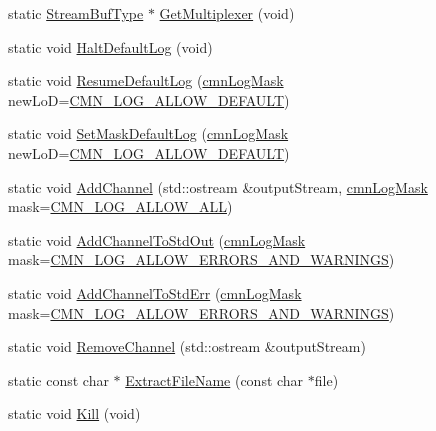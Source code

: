 \begin{DoxyCompactItemize}
\item 
static \hyperlink{classcmn_logger_a7d192777882d1dc6bb48ceac0b4e65bb}{Stream\+Buf\+Type} $\ast$ \hyperlink{classcmn_logger_aa9a44af4d1640661d784d1da92c9d394}{Get\+Multiplexer} (void)
\item 
static void \hyperlink{classcmn_logger_ac776c83953b0b6fc8797928dbdd88692}{Halt\+Default\+Log} (void)
\item 
static void \hyperlink{classcmn_logger_adbfa3e3002c704d689674f77c9deb525}{Resume\+Default\+Log} (\hyperlink{cmn_log_lo_d_8h_a44b6ef7560b0d204460b0a54f1a5d702}{cmn\+Log\+Mask} new\+Lo\+D=\hyperlink{cmn_log_lo_d_8h_a941e5ff3075571f0ad1e53e1204bd856}{C\+M\+N\+\_\+\+L\+O\+G\+\_\+\+A\+L\+L\+O\+W\+\_\+\+D\+E\+F\+A\+U\+L\+T})
\item 
static void \hyperlink{classcmn_logger_a1382ea96a6eb493c5aff86256b1f5fc7}{Set\+Mask\+Default\+Log} (\hyperlink{cmn_log_lo_d_8h_a44b6ef7560b0d204460b0a54f1a5d702}{cmn\+Log\+Mask} new\+Lo\+D=\hyperlink{cmn_log_lo_d_8h_a941e5ff3075571f0ad1e53e1204bd856}{C\+M\+N\+\_\+\+L\+O\+G\+\_\+\+A\+L\+L\+O\+W\+\_\+\+D\+E\+F\+A\+U\+L\+T})
\item 
static void \hyperlink{classcmn_logger_aa051a07e639b507c0db05af0aafd266e}{Add\+Channel} (std\+::ostream \&output\+Stream, \hyperlink{cmn_log_lo_d_8h_a44b6ef7560b0d204460b0a54f1a5d702}{cmn\+Log\+Mask} mask=\hyperlink{cmn_log_lo_d_8h_acf03c43c8a0fbe1c13b2aa4ac3b0a856}{C\+M\+N\+\_\+\+L\+O\+G\+\_\+\+A\+L\+L\+O\+W\+\_\+\+A\+L\+L})
\item 
static void \hyperlink{classcmn_logger_a3dc3179f73e32ba953e6c54f04e7e2a8}{Add\+Channel\+To\+Std\+Out} (\hyperlink{cmn_log_lo_d_8h_a44b6ef7560b0d204460b0a54f1a5d702}{cmn\+Log\+Mask} mask=\hyperlink{cmn_log_lo_d_8h_a4414b84b0d7c28e5df5728224b987125}{C\+M\+N\+\_\+\+L\+O\+G\+\_\+\+A\+L\+L\+O\+W\+\_\+\+E\+R\+R\+O\+R\+S\+\_\+\+A\+N\+D\+\_\+\+W\+A\+R\+N\+I\+N\+G\+S})
\item 
static void \hyperlink{classcmn_logger_a987bfb4a959245edb504f34392f16904}{Add\+Channel\+To\+Std\+Err} (\hyperlink{cmn_log_lo_d_8h_a44b6ef7560b0d204460b0a54f1a5d702}{cmn\+Log\+Mask} mask=\hyperlink{cmn_log_lo_d_8h_a4414b84b0d7c28e5df5728224b987125}{C\+M\+N\+\_\+\+L\+O\+G\+\_\+\+A\+L\+L\+O\+W\+\_\+\+E\+R\+R\+O\+R\+S\+\_\+\+A\+N\+D\+\_\+\+W\+A\+R\+N\+I\+N\+G\+S})
\item 
static void \hyperlink{classcmn_logger_a684d64bb96e292d9ef2eda7914545f09}{Remove\+Channel} (std\+::ostream \&output\+Stream)
\item 
static const char $\ast$ \hyperlink{classcmn_logger_a9467522ba63faf595dc3f2358102081a}{Extract\+File\+Name} (const char $\ast$file)
\item 
static void \hyperlink{classcmn_logger_a9c7aec5075fdb12cc8df86bfe306e073}{Kill} (void)
\end{DoxyCompactItemize}
